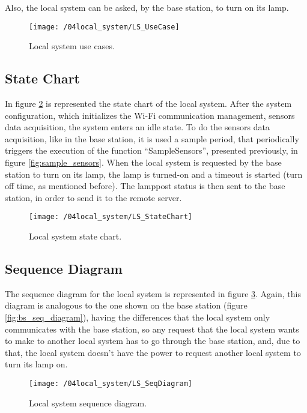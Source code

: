 Also, the local system can be asked, by the base station, to turn on its lamp.
\clearpage

\begin{figure}[ht]
	\centering
	\texttt{[image: /04local\_system/LS\_UseCase]}
	\caption{Local system use cases.}
	\label{fig:ls_use_cases}
\end{figure}

\subsection{State Chart}
In figure \ref{fig:ls_state_chart} is represented the state chart of the local system. After the system configuration, which initializes the Wi-Fi communication management, sensors data acquisition, the system enters an idle state. To do the sensors data acquisition, like in the base station, it is used a sample period, that periodically triggers the execution of the function “SampleSensors”, presented previously, in figure \ref{fig:sample_sensors}. When the local system is requested by the base station to turn on its lamp, the lamp is turned-on and a timeout is started (turn off time, as mentioned before). The lamppost status is then sent to the base station, in order to send it to the remote server.

\begin{figure}[ht]
	\centering
	\texttt{[image: /04local\_system/LS\_StateChart]}
	\caption{Local system state chart.}
	\label{fig:ls_state_chart}
\end{figure}

\clearpage
\subsection{Sequence Diagram}
The sequence diagram for the local system is represented in figure \ref{fig:ls_seq_diagram}. Again, this diagram is analogous to the one shown on the base station (figure \ref{fig:bs_seq_diagram}), having the differences that the local system only communicates with the base station, so any request that the local system wants to make to another local system has to go through the base station, and, due to that, the local system doesn't have the power to request another local system to turn its lamp on.

\begin{figure}[ht]
	\centering
	\texttt{[image: /04local\_system/LS\_SeqDiagram]}
	\caption{Local system sequence diagram.}
	\label{fig:ls_seq_diagram}
\end{figure}